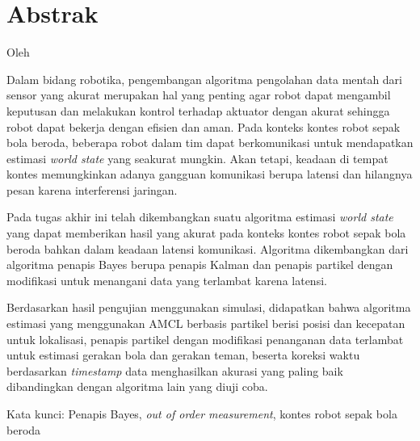 \clearpage
\chapter*{Abstrak}

\begin{center}
	\large{\bfseries{
			\MakeUppercase\thetitle
		}
	}

	\normalsize{
		Oleh\\
		\MakeUppercase \theauthor
	}
\end{center}

\medskip

\begin{spacing}{1.0}

	Dalam bidang robotika, pengembangan algoritma pengolahan data mentah dari sensor yang akurat merupakan hal yang penting agar robot dapat mengambil keputusan dan melakukan kontrol terhadap aktuator dengan akurat sehingga robot dapat bekerja dengan efisien dan aman. Pada konteks kontes robot sepak bola beroda, beberapa robot dalam tim dapat berkomunikasi untuk mendapatkan estimasi \textit{world state} yang seakurat mungkin. Akan tetapi, keadaan di tempat kontes memungkinkan adanya gangguan komunikasi berupa latensi dan hilangnya pesan karena interferensi jaringan.

	Pada tugas akhir ini telah dikembangkan suatu algoritma estimasi \textit{world state} yang dapat memberikan hasil yang akurat pada konteks kontes robot sepak bola beroda bahkan dalam keadaan latensi komunikasi. Algoritma dikembangkan dari algoritma penapis Bayes berupa penapis Kalman dan penapis partikel dengan modifikasi untuk menangani data yang terlambat karena latensi.

	Berdasarkan hasil pengujian menggunakan simulasi, didapatkan bahwa algoritma estimasi yang menggunakan AMCL berbasis partikel berisi posisi dan kecepatan untuk lokalisasi, penapis partikel dengan modifikasi penanganan data terlambat untuk estimasi gerakan bola dan gerakan teman, beserta koreksi waktu berdasarkan \textit{timestamp} data menghasilkan akurasi yang paling baik dibandingkan dengan algoritma lain yang diuji coba.

	Kata kunci: Penapis Bayes, \textit{out of order measurement}, kontes robot sepak bola beroda

\end{spacing}

\clearpage
